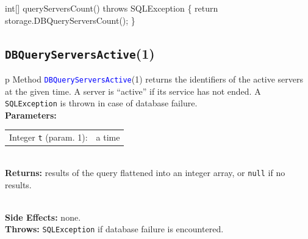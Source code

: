 \nwenddocs{}\endmoddef{}
int[] queryServersCount() throws SQLException \{
  return storage.DBQueryServersCount();
\}
\eatline
{}\nwendcode{}\nwdocspar
\subsection{\texttt{DBQueryServersActive}(1)}
\begin{tabular}{p{\textwidth}}
\toprule
{}
Method \textcolor{blue}{{\tt{}\protect{}DBQueryServersActive}}(1) returns the identifiers
of the active servers at the given time. A server is ``active'' if its
service has not ended.
A {\tt{}SQLException} is thrown in case of database failure.\\
\midrule
\textbf{Parameters:} \\
\begin{tabular}{lp{116mm}}
Integer {\tt{}t} (param. 1):&a time
\end{tabular}\\
\textbf{Returns:} results of the query flattened into an integer array, or
{\tt{}null} if no results.

\\
\textbf{Side Effects:} none.\\
\textbf{Throws:} {\tt{}SQLException} if database failure is encountered.\\
\bottomrule
\end{tabular}
\nwenddocs{}\endmoddef{}
